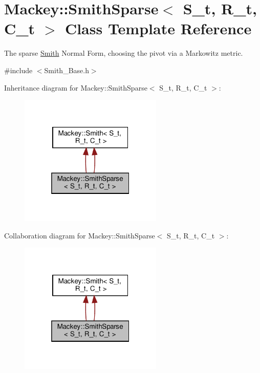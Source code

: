 \hypertarget{classMackey_1_1SmithSparse}{}\section{Mackey\+:\+:Smith\+Sparse$<$ S\+\_\+t, R\+\_\+t, C\+\_\+t $>$ Class Template Reference}
\label{classMackey_1_1SmithSparse}


The sparse \hyperlink{classMackey_1_1Smith}{Smith} Normal Form, choosing the pivot via a Markowitz metric.  




{\ttfamily \#include $<$Smith\+\_\+\+Base.\+h$>$}



Inheritance diagram for Mackey\+:\+:Smith\+Sparse$<$ S\+\_\+t, R\+\_\+t, C\+\_\+t $>$\+:\nopagebreak
\begin{figure}[H]
\begin{center}
\leavevmode
\includegraphics[width=193pt]{classMackey_1_1SmithSparse__inherit__graph}
\end{center}
\end{figure}


Collaboration diagram for Mackey\+:\+:Smith\+Sparse$<$ S\+\_\+t, R\+\_\+t, C\+\_\+t $>$\+:\nopagebreak
\begin{figure}[H]
\begin{center}
\leavevmode
\includegraphics[width=193pt]{classMackey_1_1SmithSparse__coll__graph}
\end{center}
\end{figure}
